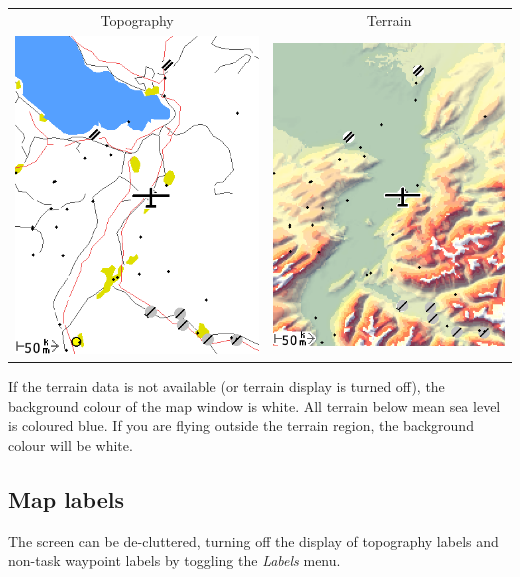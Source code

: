 \begin{center}
\begin{tabular}{c c}
Topography & Terrain \\
\includegraphics[angle=0,width=0.4\linewidth,keepaspectratio='true']{figures/cut-topo.png} &
\includegraphics[angle=0,width=0.4\linewidth,keepaspectratio='true']{figures/cut-terrain.png} \\
\end{tabular}
\end{center}

If the terrain data is not available (or terrain display is turned
off), the background colour of the map window is white.  All terrain
below mean sea level is coloured blue.  If you are flying outside the
terrain region, the background colour will be white.

\subsection*{Map labels}\label{sec:maplabels}

The screen can be de-cluttered, turning off the display of topography
labels and non-task waypoint labels by toggling the {\it Labels} menu.

